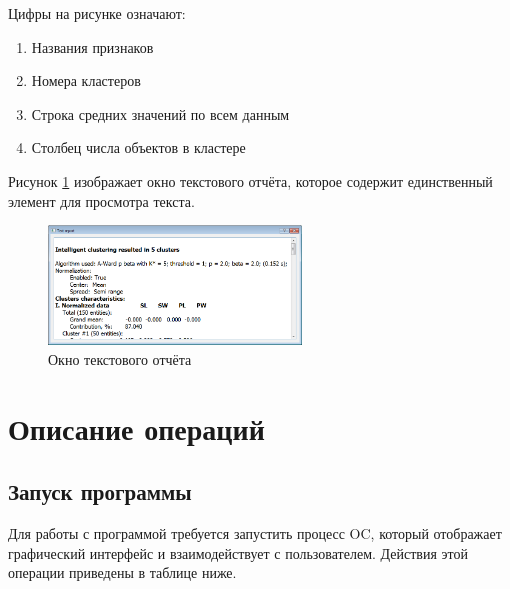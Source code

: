 \documentclass[12pt,tikz]{instruction}
\begin{document}
Цифры на рисунке означают:
\begin{enumerate}
	\item Названия признаков
	\item Номера кластеров
	\item Строка средних значений по всем данным
	\item Столбец числа объектов в кластере
\end{enumerate}
Рисунок \ref{fig:text-report} изображает окно текстового отчёта, которое содержит единственный элемент для просмотра текста.
\begin{figure}[H]
	\centering
	\includegraphics[width=0.6\textwidth]{img2/text-report.png}
	\caption{Окно текстового отчёта}
	\label{fig:text-report}
\end{figure}

\newpage
\section{Описание операций}

\subsection{Запуск программы}
Для работы с программой требуется запустить процесс OC, который отображает графический интерфейс и взаимодействует с пользователем. Действия этой операции приведены в таблице ниже.
\end{document}
